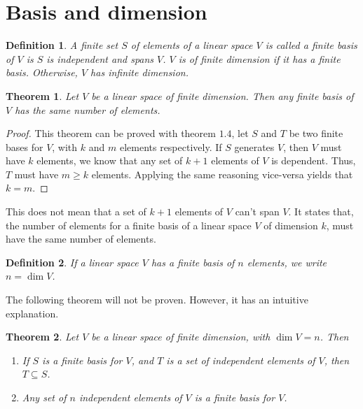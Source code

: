 \documentclass{book}
\newtheorem{theorem}{Theorem}[section]
\newtheorem{definition}{Definition}[section]
\begin{document}
\section{Basis and dimension}
\begin{definition}
    A finite set $S$ of elements of a linear space $V$ is called a \textit{finite basis} of $V$ is $S$ is independent and spans $V$.
    $V$ is of finite dimension if it has a finite basis. Otherwise, $V$ has infinite dimension.
\end{definition}

\begin{theorem}
    Let $V$ be a linear space of finite dimension. Then any finite basis of $V$ has the same number of elements.
\end{theorem}

\begin{proof}
    This theorem can be proved with theorem $1.4$, let $S$ and $T$ be two finite bases for $V$, with $k$ and $m$ elements respectively.
    If $S$ generates $V$, then $V$ must have $k$ elements, we know that any set of $k+1$ elements of $V$ is dependent. Thus, $T$ must have
    $m\geq k$ elements. Applying the same reasoning vice-versa yields that $k=m$.
\end{proof}

This does not mean that a set of $k+1$ elements of $V$ can't span $V$. It
states that, the number of elements for a finite basis of a linear space $V$ of
dimension $k$, must have the same number of elements.

\begin{definition}
    If a linear space $V$ has a finite basis of $n$ elements, we write $n=\dim V$.
\end{definition}

The following theorem will not be proven. However, it has an intuitive
explanation.

\begin{theorem}
    Let $V$ be a linear space of finite dimension, with $\dim V = n$. Then

    \begin{enumerate}
        \item If $S$ is a finite basis for $V$, and $T$ is a set of independent elements of
              $V$, then $T\subseteq S$.
        \item Any set of $n$ independent elements of $V$ is a finite basis for $V$.
    \end{enumerate}

\end{theorem}
\end{document}

